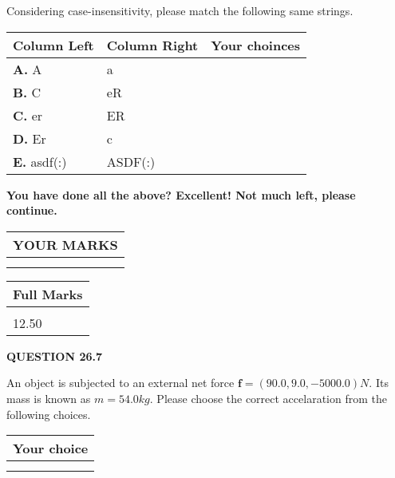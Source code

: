 \documentclass[12pt]{article}
\begin{document}
  
Considering case-insensitivity, please match the following same strings.
  
  
\begin{tabular}{|l|l|l|}
 \hline
 Column Left & Column Right  & Your choinces \\ 
 \hline
{\textbf{\large{
A.}}}
A
  & 
a
 & 
 \\ 
 \hline
{\textbf{\large{
B.}}}
C
  & 
eR
 & 
 \\ 
 \hline
{\textbf{\large{
C.}}}
er
  & 
ER
 & 
 \\ 
 \hline
{\textbf{\large{
D.}}}
Er
  & 
c
 & 
 \\ 
 \hline
{\textbf{\large{
E.}}}
asdf(:)
  & 
ASDF(:)
 & 
 \\ 
 \hline
 \end{tabular}
  
  
 
   
   
\vspace{0.3in}
{\textbf{\LARGE{You have done all the above? Excellent! Not much left, please continue.}}}
\vspace{0.3in}
   
   
  
\vspace{0.2in}
  
\noindent\begin{tabular}{|l|}
\hline
 YOUR MARKS  \\
\hline
 \\ 
 \\ 
\hline
\end{tabular}
\hspace{0.05in} \begin{tabular}{|l|}
\hline
 Full Marks  \\
\hline
 \\ 
12.50 \\
\hline
\end{tabular}
{\textbf{\Large{QUESTION
26.7 
}}}
  
  
 
An object is subjected to an external net force $\mathbf{f}=
(90.0 , 9.0 , -5000.0) N$.
Its mass is known as $m= %
54.0 kg$.
Please choose the correct accelaration from the following choices.
  
  
\noindent\hspace{3.0in} \begin{tabular}{|l|}
\hline
Your choice \\
\hline
 \\ 
 \\ 
\hline
\end{tabular}
  
\end{document}
